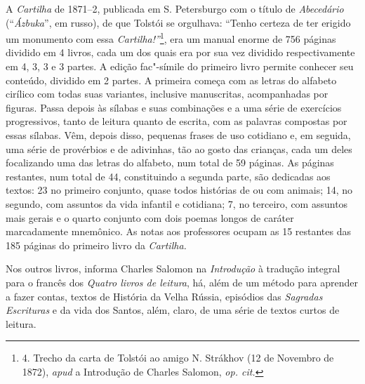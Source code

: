 A \emph{Cartilha} de 1871--2, publicada em S. Petersburgo com o título
de \emph{Abecedário} (``\emph{Ázbuka}'', em russo), de que Tolstói se
orgulhava: ``Tenho certeza de ter erigido um monumento com
essa \emph{Cartilha!''}\footnote{4. Trecho da carta de Tolstói ao amigo
  N. Strákhov (12 de Novembro de 1872), \emph{apud} a Introdução de
  Charles Salomon, \emph{op. cit.}}, era um manual enorme de 756 páginas
dividido em 4 livros, cada um dos quais era por sua vez dividido
respectivamente em 4, 3, 3 e 3 partes. A edição fac"-símile do primeiro
livro permite conhecer seu conteúdo, dividido em 2 partes. A primeira
começa com as letras do alfabeto cirílico com todas suas variantes,
inclusive manuscritas, acompanhadas por figuras. Passa depois às sílabas
e suas combinações e a uma série de exercícios progressivos, tanto de
leitura quanto de escrita, com as palavras compostas por essas sílabas.
Vêm, depois disso, pequenas frases de uso cotidiano e, em seguida, uma
série de provérbios e de adivinhas, tão ao gosto das crianças, cada um
deles focalizando uma das letras do alfabeto, num total de 59 páginas.
As páginas restantes, num total de 44, constituindo a segunda parte, são
dedicadas aos textos: 23 no primeiro conjunto, quase todos histórias de
ou com animais; 14, no segundo, com assuntos da vida infantil e
cotidiana; 7, no terceiro, com assuntos mais gerais e o quarto conjunto
com dois poemas longos de caráter marcadamente mnemônico. As notas aos
professores ocupam as 15 restantes das 185 páginas do primeiro livro
da \emph{Cartilha.}

Nos outros livros, informa Charles Salomon na \emph{Introdução} à
tradução integral para o francês dos \emph{Quatro livros de
leitura}, há, além de um método para aprender a fazer contas, textos de
História da Velha Rússia, episódios das \emph{Sagradas Escrituras} e da vida
dos Santos, além, claro, de uma série de textos curtos de leitura.

